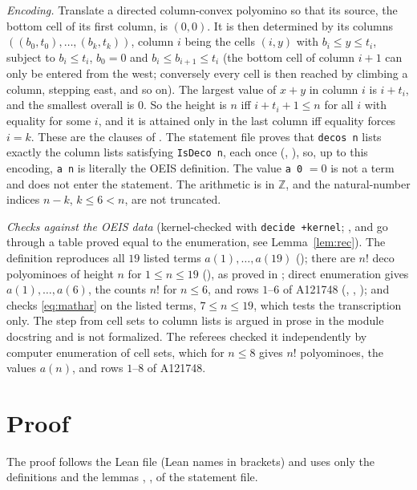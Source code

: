 \documentclass[11pt]{amsart}
\theoremstyle{plain}
\theoremstyle{definition}
\newcommand{\Z}{\mathbb{Z}}
\begin{document}
\emph{Encoding.} Translate a directed column-convex polyomino so that its source, the bottom cell of its first column, is $(0,0)$. It is then determined by its columns $((b_0,t_0),\dots,(b_k,t_k))$, column $i$ being the cells $(i,y)$ with $b_i\le y\le t_i$, subject to $b_i\le t_i$, $b_0=0$ and $b_i\le b_{i+1}\le t_i$ (the bottom cell of column $i+1$ can only be entered from the west; conversely every cell is then reached by climbing a column, stepping east, and so on). The largest value of $x+y$ in column $i$ is $i+t_i$, and the smallest overall is $0$. So the height is $n$ iff $i+t_i+1\le n$ for all $i$ with equality for some $i$, and it is attained only in the last column iff equality forces $i=k$. These are the clauses of . The statement file proves that \texttt{decos n} lists exactly the column lists satisfying \texttt{IsDeco n}, each once (, ), so, up to this encoding, \texttt{a n} is literally the OEIS definition. The value \texttt{a 0} $=0$ is not a term and does not enter the statement. The arithmetic is in $\Z$, and the natural-number indices $n-k$, $k\le6<n$, are not truncated.

\emph{Checks against the OEIS data} (kernel-checked with \texttt{decide +kernel}; ,  and  go through a table proved equal to the enumeration, see Lemma~\ref{lem:rec}). The definition reproduces all $19$ listed terms $a(1),\dots,a(19)$ (); there are $n!$ deco polyominoes of height $n$ for $1\le n\le19$ (), as proved in \cite{BDP}; direct enumeration gives $a(1),\dots,a(6)$, the counts $n!$ for $n\le6$, and rows $1$--$6$ of A121748 (, , ); and  checks \eqref{eq:mathar} on the listed terms, $7\le n\le19$, which tests the transcription only. The step from cell sets to column lists is argued in prose in the module docstring and is not formalized. The referees checked it independently by computer enumeration of cell sets, which for $n\le8$ gives $n!$ polyominoes, the values $a(n)$, and rows $1$--$8$ of A121748.

\section{Proof}\label{sec:proof}

The proof follows the Lean file  (Lean names in brackets) and uses only the definitions and the lemmas , ,  of the statement file.
\end{document}
